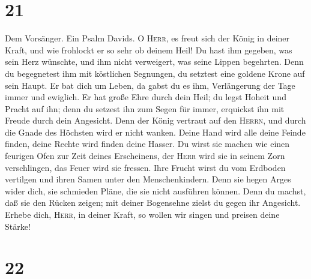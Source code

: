\hypertarget{section-20}{%
\section{21}\label{section-20}}

 Dem Vorsänger. Ein Psalm Davids. O \textsc{Herr}, es
freut sich der König in deiner Kraft, und wie frohlockt er so sehr ob
deinem Heil!  Du hast ihm gegeben, was sein Herz wünschte,
und ihm nicht verweigert, was seine Lippen begehrten. 
Denn du begegnetest ihm mit köstlichen Segnungen, du setztest eine
goldene Krone auf sein Haupt.  Er bat dich um Leben, da
gabst du es ihm, Verlängerung der Tage immer und ewiglich.
 Er hat große Ehre durch dein Heil; du legst Hoheit und
Pracht auf ihn;  denn du setzest ihn zum Segen für immer,
erquickst ihn mit Freude durch dein Angesicht.  Denn der
König vertraut auf den \textsc{Herrn}, und durch die Gnade des Höchsten
wird er nicht wanken.  Deine Hand wird alle deine Feinde
finden, deine Rechte wird finden deine Hasser.  Du wirst
sie machen wie einen feurigen Ofen zur Zeit deines Erscheinens, der
\textsc{Herr} wird sie in seinem Zorn verschlingen, das Feuer wird sie
fressen.  Ihre Frucht wirst du vom Erdboden vertilgen und
ihren Samen unter den Menschenkindern.  Denn sie hegen
Arges wider dich, sie schmieden Pläne, die sie nicht ausführen können.
 Denn du machst, daß sie den Rücken zeigen; mit deiner
Bogensehne zielst du gegen ihr Angesicht.  Erhebe dich,
\textsc{Herr}, in deiner Kraft, so wollen wir singen und preisen deine
Stärke!

\hypertarget{section-21}{%
\section{22}\label{section-21}}

